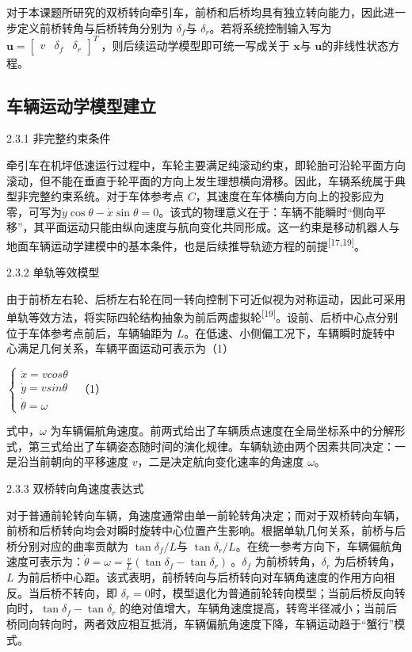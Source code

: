 对于本课题所研究的双桥转向牵引车，前桥和后桥均具有独立转向能力，因此进一步定义前桥转角与后桥转角分别为
\(\delta_{f}\)与
\(\delta_{r}\)。若将系统控制输入写为\(\mathbf{u} = \begin{bmatrix}
v & \delta_{f} & \delta_{r}
\end{bmatrix}^{T}\ ，\)则后续运动学模型即可统一写成关于 \(\mathbf{x}\)与
\(\mathbf{u}\)的非线性状态方程。

\subsection{车辆运动学模型建立}

2.3.1 非完整约束条件

牵引车在机坪低速运行过程中，车轮主要满足纯滚动约束，即轮胎可沿轮平面方向滚动，但不能在垂直于轮平面的方向上发生理想横向滑移。因此，车辆系统属于典型非完整约束系统。对于车体参考点
\(C\)，其速度在车体横向方向上的投影应为零，可写为\(\dot{y}\cos\theta - \dot{x}\sin\theta = 0\)。该式的物理意义在于：车辆不能瞬时``侧向平移''，其平面运动只能由纵向速度与航向变化共同形成。这一约束是移动机器人与地面车辆运动学建模中的基本条件，也是后续推导轨迹方程的前提\textsuperscript{[17,19]}。

2.3.2 单轨等效模型

由于前桥左右轮、后桥左右轮在同一转向控制下可近似视为对称运动，因此可采用单轨等效方法，将实际四轮结构抽象为前后两虚拟轮\textsuperscript{[19]}。设前、后桥中心点分别位于车体参考点前后，车辆轴距为
\(L\)。在低速、小侧偏工况下，车辆瞬时旋转中心满足几何关系，车辆平面运动可表示为（1）

\(\left\{ \begin{array}{r}
\dot{x} = vcos\theta \\
\dot{y} = vsin\theta \\
\dot{\theta} = \omega\ 
\end{array} \right.\ \) （1）

式中，\(\omega\)
为车辆偏航角速度。前两式给出了车辆质点速度在全局坐标系中的分解形式，第三式给出了车辆姿态随时间的演化规律。车辆轨迹由两个因素共同决定：一是沿当前朝向的平移速度
\(v\)，二是决定航向变化速率的角速度 \(\omega\)。

2.3.3 双桥转向角速度表达式

对于普通前轮转向车辆，角速度通常由单一前轮转角决定；而对于双桥转向车辆，前桥和后桥转向均会对瞬时旋转中心位置产生影响。根据单轨几何关系，前桥与后桥分别对应的曲率贡献为
\(\tan\delta_{f}/L\)与
\(\tan\delta_{r}/L\)。在统一参考方向下，车辆偏航角速度可表示为：\(\dot{\theta} = \omega = \frac{v}{L}\left( \tan\delta_{f} - \tan\delta_{r} \right)\ 。\delta_{f}\)
为前桥转角，\(\delta_{r}\) 为后桥转角，\(L\)
为前后桥中心距。该式表明，前桥转向与后桥转向对车辆角速度的作用方向相反。当后桥不转向，即
\(\delta_{r} = 0\)时，模型退化为普通前轮转向模型；当前后桥反向转向时，\(\tan\delta_{f} - \tan\delta_{r}\)
的绝对值增大，车辆角速度提高，转弯半径减小；当前后桥同向转向时，两者效应相互抵消，车辆偏航角速度下降，车辆运动趋于``蟹行''模式。

